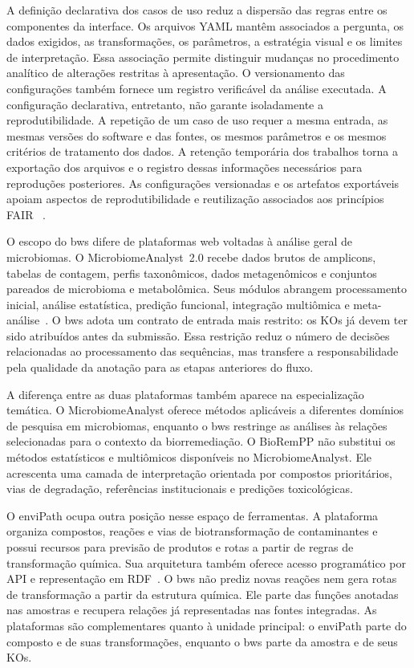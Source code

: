 A definição declarativa dos casos de uso reduz a dispersão das regras entre os
componentes da interface. Os arquivos YAML mantêm associados a pergunta, os
dados exigidos, as transformações, os parâmetros, a estratégia visual e os
limites de interpretação. Essa associação permite distinguir mudanças no
procedimento analítico de alterações restritas à apresentação. O
versionamento das configurações também fornece um registro verificável da
análise executada. A configuração declarativa, entretanto, não garante isoladamente a
reprodutibilidade. A repetição de um caso de uso requer a mesma entrada, as
mesmas versões do software e das fontes, os mesmos parâmetros e os mesmos
critérios de tratamento dos dados. A retenção temporária dos trabalhos torna a
exportação dos arquivos e o registro dessas informações necessários para
reproduções posteriores. As configurações versionadas e os artefatos
exportáveis apoiam aspectos de reprodutibilidade e reutilização associados aos
princípios FAIR ~\cite{wilkinson2016fair}.

O escopo do \gls{bws} difere de plataformas web voltadas à análise geral de
microbiomas. O MicrobiomeAnalyst~2.0 recebe dados brutos de amplicons, tabelas
de contagem, perfis taxonômicos, dados metagenômicos e conjuntos pareados de
microbioma e metabolômica. Seus módulos abrangem processamento inicial,
análise estatística, predição funcional, integração multiômica e
meta-análise~\cite{lu2023microbiomeanalyst}. O \gls{bws} adota um contrato de
entrada mais restrito: os KOs já devem ter sido atribuídos antes da submissão.
Essa restrição reduz o número de decisões relacionadas ao processamento das
sequências, mas transfere a responsabilidade pela qualidade da anotação para
as etapas anteriores do fluxo.

A diferença entre as duas plataformas também aparece na especialização
temática. O MicrobiomeAnalyst oferece métodos aplicáveis a diferentes
domínios de pesquisa em microbiomas, enquanto o \gls{bws} restringe as
análises às relações selecionadas para o contexto da biorremediação. O
BioRemPP não substitui os métodos estatísticos e multiômicos disponíveis no
MicrobiomeAnalyst. Ele acrescenta uma camada de interpretação orientada por
compostos prioritários, vias de degradação, referências institucionais e
predições toxicológicas.

O enviPath ocupa outra posição nesse espaço de ferramentas. A plataforma
organiza compostos, reações e vias de biotransformação de contaminantes e
possui recursos para previsão de produtos e rotas a partir de regras de
transformação química. Sua arquitetura também oferece acesso programático por
API e representação em RDF~\cite{wicker2016envipath}. O \gls{bws} não prediz
novas reações nem gera rotas de transformação a partir da estrutura química.
Ele parte das funções anotadas nas amostras e recupera relações já
representadas nas fontes integradas. As plataformas são complementares quanto
à unidade principal: o enviPath parte do composto e de suas transformações,
enquanto o \gls{bws} parte da amostra e de seus KOs.


